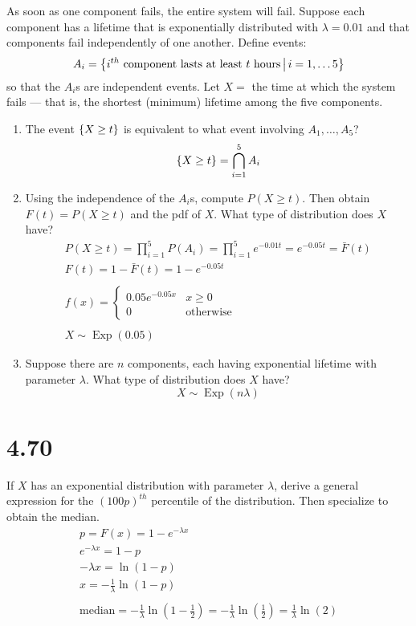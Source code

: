 \documentclass[letterpaper,12pt,fleqn]{article}
\renewcommand{\l}{\lambda}
\DeclareMathOperator{\expd}{Exp}
\begin{document}
As soon as one component fails, the entire system will fail.  Suppose each component has a lifetime that is exponentially
distributed with \(\l=0.01\) and that components fail independently of one another.  Define events:
\[A_i=\left\{{i^{th}\ \text{component lasts at least}\ t\ \text{hours}}\,\middle|\,{i=1,\ldots5}\right\}\]
so that the \(A_i\)s are independent events.  Let \(X=\) the time at which the system fails --- that is, the shortest (minimum)
lifetime among the five components.
\begin{enumerate}[label={\alph*)}]
\item The event \(\{X\ge t\}\) is equivalent to what event involving \(A_1,\ldots,A_5\)?
  \[\{X\ge t\}=\bigcap_{i=1}^5A_i\]
\item Using the independence of the \(A_i\)s, compute \(P(X\ge t)\).  Then obtain \(F(t)=P(X\ge t)\) and the pdf of \(X\).
  What type of distribution does \(X\) have?
  \begin{gather*}
    P(X\ge t)=\prod_{i=1}^5P(A_i)=\prod_{i=1}^5e^{-0.01t}=e^{-0.05t}=\bar{F}(t) \\
    F(t)=1-\bar{F}(t)=1-e^{-0.05t} \\
    \\
    f(x)=\begin{cases}
    0.05e^{-0.05x} & x\ge 0 \\
    0 & \text{otherwise}
    \end{cases} \\
    \\
    X\sim\expd(0.05)
  \end{gather*}
\item Suppose there are \(n\) components, each having exponential lifetime with parameter \(\l\).  What type of distribution
  does \(X\) have?
  \[X\sim\expd(n\l)\]
\end{enumerate}

\section*{4.70}

If \(X\) has an exponential distribution with parameter \(\l\), derive a general expression for the \((100p)^{th}\)
percentile of the distribution.  Then specialize to obtain the median.
\begin{gather*}
  p=F(x)=1-e^{-\l x} \\
  e^{-\l x}=1-p \\
  -\l x=\ln(1-p) \\
  x=-\frac{1}{\l}\ln(1-p) \\
  \\
  \text{median}=-\frac{1}{\l}\ln\left(1-\frac{1}{2}\right)=-\frac{1}{\l}\ln\left(\frac{1}{2}\right)=
  \frac{1}{\l}\ln(2) \\
\end{gather*}
\end{document}
